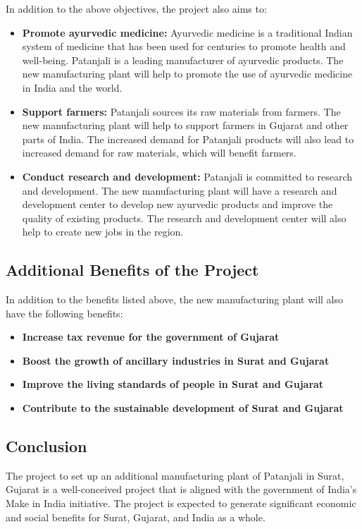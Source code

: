 In addition to the above objectives, the project also aims to:

\begin{itemize}
    \item \textbf{Promote ayurvedic medicine:} Ayurvedic medicine is a traditional Indian system of medicine that has been used for centuries to promote health and well-being. Patanjali is a leading manufacturer of ayurvedic products. The new manufacturing plant will help to promote the use of ayurvedic medicine in India and the world.

    \item \textbf{Support farmers:} Patanjali sources its raw materials from farmers. The new manufacturing plant will help to support farmers in Gujarat and other parts of India. The increased demand for Patanjali products will also lead to increased demand for raw materials, which will benefit farmers.

    \item \textbf{Conduct research and development:} Patanjali is committed to research and development. The new manufacturing plant will have a research and development center to develop new ayurvedic products and improve the quality of existing products. The research and development center will also help to create new jobs in the region.
\end{itemize}

\subsection{Additional Benefits of the Project}
In addition to the benefits listed above, the new manufacturing plant will also have the following benefits:

\begin{itemize}
    \item \textbf{Increase tax revenue for the government of Gujarat}
    \item \textbf{Boost the growth of ancillary industries in Surat and Gujarat}
    \item \textbf{Improve the living standards of people in Surat and Gujarat}
    \item \textbf{Contribute to the sustainable development of Surat and Gujarat}
\end{itemize}

\subsection{Conclusion}
The project to set up an additional manufacturing plant of Patanjali in Surat, Gujarat is a well-conceived project that is aligned with the government of India's Make in India initiative. The project is expected to generate significant economic and social benefits for Surat, Gujarat, and India as a whole.


